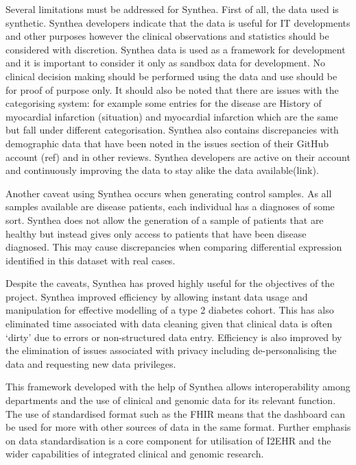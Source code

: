 \documentclass{bioinfo}
\begin{document}
\begin{Discussion}
Several limitations must be addressed for Synthea. First of all, the data used is synthetic. Synthea developers indicate that the data is useful for IT developments and other purposes however the clinical observations and statistics should be considered with discretion. Synthea data is used as a framework for development and it is important to consider it only as sandbox data for development. No clinical decision making should be performed using the data and use should be for proof of purpose only. It should also be noted that there are issues with the categorising system: for example some entries for the disease are History of myocardial infarction (situation) and myocardial infarction which are the same but fall under different 
categorisation. Synthea also contains discrepancies with demographic data that have been noted in the issues section of their GitHub account (ref) and in other reviews. Synthea developers are active on their account and continuously improving the data to stay alike the data available(link). 

Another caveat using Synthea occurs when generating control samples. As all samples available are disease patients, each individual has a diagnoses of some sort. Synthea does not allow the generation of a sample of patients that are healthy but instead gives only access to patients that have been disease diagnosed. This may cause discrepancies when comparing differential expression identified in this dataset with real cases. 

Despite the caveats, Synthea has proved highly useful for the objectives of the project. Synthea improved efficiency by allowing instant data usage and manipulation for effective modelling of a type 2 diabetes cohort. This has also eliminated time associated with data cleaning given that clinical data is often ‘dirty’ due to errors or non-structured data entry. Efficiency is also improved by the elimination of issues associated with privacy including de-personalising the data and requesting new data privileges.

This framework developed with the help of Synthea allows interoperability among departments and the use of clinical and genomic data for its relevant function. The use of standardised format such as the FHIR means that the dashboard can be used for more with other sources of data in the same format. Further emphasis on data standardisation is a core component for utilisation of I2EHR and the wider capabilities of integrated clinical and genomic research.



\end{Discussion}
\end{document}
